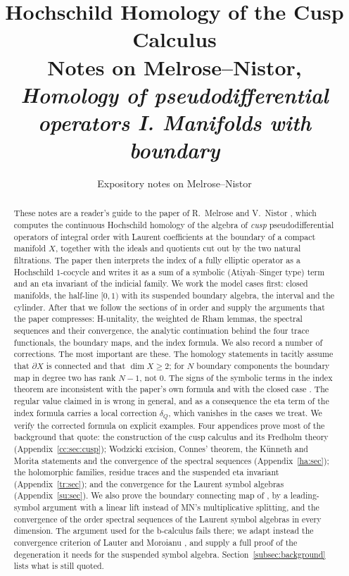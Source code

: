 \documentclass[11pt,oneside,reqno]{article}
\title{Hochschild Homology of the Cusp Calculus\\[4pt]
\large Notes on Melrose--Nistor, \emph{Homology of pseudodifferential
operators I. Manifolds with boundary}}
\author{Expository notes on Melrose--Nistor}
\date{}
\theoremstyle{plain}
\theoremstyle{definition}
\theoremstyle{remark}
\begin{document}
\hypersetup{pageanchor=false}
\maketitle
\thispagestyle{empty}
\clearpage
\hypersetup{pageanchor=true}
\begingroup
\small
\tableofcontents
\endgroup
\clearpage
\listoffigures
\clearpage
{}
\setcounter{page}{1}

\begin{abstract}
These notes are a reader's guide to the paper of R.~Melrose and
V.~Nistor \cite{MN}, which computes the continuous Hochschild homology of the
algebra of \emph{cusp} pseudodifferential operators of integral order with
Laurent coefficients at the boundary of a compact manifold \(X\), together
with the ideals and quotients cut out by the two natural filtrations. The
paper then interprets the index of a fully elliptic operator as a
Hochschild \(1\)-cocycle and writes it as a sum of a symbolic
(Atiyah--Singer type) term and an eta invariant of the indicial family.
We work the model cases first: closed manifolds, the half-line
\([0,1)\) with its suspended boundary algebra, the interval and the
cylinder. After that we follow the sections of \cite{MN} in order and supply the
arguments that the paper compresses: H-unitality, the weighted de Rham
lemmas, the spectral sequences and their convergence, the analytic
continuation behind the four trace functionals, the boundary maps, and the
index formula. We also record a number of corrections. The most important
are these. The homology statements in \cite[(16)]{MN} tacitly assume that
\(\partial X\) is connected and that \(\dim X\ge2\); for \(N\) boundary
components the boundary map in degree two has rank \(N-1\), not \(0\). The
signs of the symbolic terms in the index theorem \cite[(93)]{MN} are
inconsistent with the paper's own formula \cite[(87)]{MN} and with the
closed case \cite[(3), (5)]{MN}. The regular value claimed in
\cite[Prop.~8]{MN} is wrong in general, and as a consequence the eta term of
the index formula carries a local correction \(\delta_Q\), which vanishes in
the cases we treat. We verify the corrected formula on explicit examples.
Four appendices prove most of the background that \cite{MN} quote: the
construction of the cusp calculus and its Fredholm theory
(Appendix~\ref{cc:sec:cusp}); Wodzicki excision, Connes' theorem, the
K\"unneth and Morita statements and the convergence of the spectral
sequences (Appendix~\ref{ha:sec}); the holomorphic families, residue
traces and the suspended eta invariant (Appendix~\ref{tr:sec}); and the
convergence for the Laurent symbol algebras (Appendix~\ref{su:sec}).
We also prove the boundary connecting map of \cite[Prop.~5]{MN}, by a
leading-symbol argument with a linear lift instead of MN's multiplicative
splitting, and the convergence of the order spectral sequences of the
Laurent symbol algebras in every dimension. The argument used for the
b-calculus fails there; we adapt instead the convergence criterion of
Lauter and Moroianu \cite{LauterMoroianu}, and supply a full proof of the
degeneration it needs for the suspended symbol algebra.
Section~\ref{subsec:background} lists what is still quoted.
\end{abstract}
\end{document}
